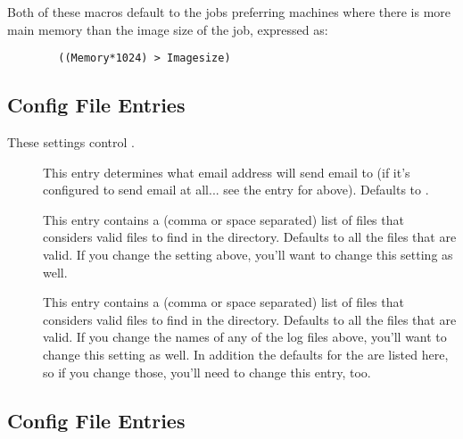 Both of these macros default to the jobs preferring machines where
there is more main memory than the image size of the job, expressed
as:

\begin{verbatim}
        ((Memory*1024) > Imagesize)
\end{verbatim}


\subsection{ Config File Entries}
\label{sec:Preen-Config-File-Entries}

These settings control .

\begin{description}

\item[] \label{param:PreenAdmin}  This entry
  determines what email address  will send email to (if
  it's configured to send email at all... see the entry for
   above).  Defaults to .

\item[] \label{param:ValidSpoolFiles}  This
  entry contains a (comma or space separated) list of files that
   considers valid files to find in the 
  directory.  Defaults to all the files that are valid.  If you change
  the  setting above, you'll want to change this
  setting as well.
  
\item[] \label{param:ValidLogFiles} This
  entry contains a (comma or space separated) list of files that
   considers valid files to find in the 
  directory.  Defaults to all the files that are valid.  If you change
  the names of any of the log files above, you'll want to change this
  setting as well.  In addition the defaults for the
   are listed here, so if you change
  those, you'll need to change this entry, too.

\end{description}


\subsection{ Config File Entries}
\label{sec:Collector-Config-File-Entries}

